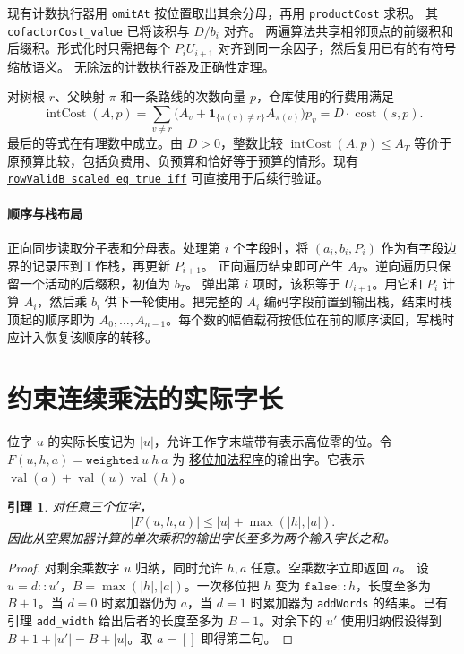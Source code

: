 \documentclass[UTF8,fontset=fandol,11pt,a4paper]{ctexart}
\newtheorem{lemma}{引理}
\newcommand{\len}[1]{\lvert #1\rvert}
\newcommand{\src}[2]{\href{https://github.com/huam54925-cpu/uav-routing-certification/blob/b083efc56ecf5b4f96f2e5b06134d1ed05806351/LeanCompletion/UAV/#1.lean}{#2}}
\begin{document}
现有计数执行器用 \texttt{omitAt} 按位置取出其余分母，再用 \texttt{productCost} 求积。
其 \texttt{cofactorCost\_value} 已将该积与 \(D/b_i\) 对齐。
两遍算法共享相邻顶点的前缀积和后缀积。形式化时只需把每个 \(P_iU_{i+1}\) 对齐到同一余因子，然后复用已有的有符号缩放语义。
\src{TreeBudgetBinaryPreprocessing}{无除法的计数执行器及正确性定理}。

对树根 \(r\)、父映射 \(\pi\) 和一条路线的次数向量 \(p\)，仓库使用的行费用满足
\[
 \operatorname{intCost}(A,p)
 =\sum_{v\ne r}
    \bigl(A_v+\mathbf{1}_{\{\pi(v)\ne r\}} A_{\pi(v)}\bigr)p_v
 = D\cdot\operatorname{cost}(s,p).
\]
最后的等式在有理数中成立。由 \(D>0\)，整数比较
\(\operatorname{intCost}(A,p)\le A_T\) 等价于原预算比较，包括负费用、负预算和恰好等于预算的情形。现有
\src{TreeBudgetVectorChecker}{\texttt{rowValidB\_scaled\_eq\_true\_iff}}
可直接用于后续行验证。

\paragraph{顺序与栈布局}
正向同步读取分子表和分母表。处理第 \(i\) 个字段时，将
\((a_i,b_i,P_i)\) 作为有字段边界的记录压到工作栈，再更新 \(P_{i+1}\)。
正向遍历结束即可产生 \(A_T\)。逆向遍历只保留一个活动的后缀积，初值为 \(b_T\)。
弹出第 \(i\) 项时，该积等于 \(U_{i+1}\)。用它和 \(P_i\) 计算 \(A_i\)，然后乘 \(b_i\) 供下一轮使用。把完整的 \(A_i\) 编码字段前置到输出栈，结束时栈顶起的顺序即为 \(A_0,\ldots,A_{n-1}\)。每个数的幅值载荷按低位在前的顺序读回，写栈时应计入恢复该顺序的转移。

\section{约束连续乘法的实际字长}

位字 \(u\) 的实际长度记为 \(\len{u}\)，允许工作字末端带有表示高位零的位。令
\(F(u,h,a)=\texttt{weighted}\ u\ h\ a\) 为
\src{TreeBudgetWeightedRuns}{移位加法程序}的输出字。它表示
\(\operatorname{val}(a)+\operatorname{val}(u)\operatorname{val}(h)\)。

\begin{lemma}
对任意三个位字，
\[
  \len{F(u,h,a)}\le \len{u}+\max(\len{h},\len{a}).
\]
因此从空累加器计算的单次乘积的输出字长至多为两个输入字长之和。
\end{lemma}
\begin{proof}
对剩余乘数字 \(u\) 归纳，同时允许 \(h,a\) 任意。空乘数字立即返回 \(a\)。
设 \(u=d::u'\)，\(B=\max(\len{h},\len{a})\)。一次移位把 \(h\) 变为
\(\texttt{false}::h\)，长度至多为 \(B+1\)。当 \(d=0\) 时累加器仍为 \(a\)，当 \(d=1\) 时累加器为 \texttt{addWords} 的结果。已有引理
\texttt{add\_width} 给出后者的长度至多为 \(B+1\)。对余下的 \(u'\) 使用归纳假设得到
\(B+1+\len{u'}=B+\len{u}\)。取 \(a=[]\) 即得第二句。
\end{proof}
\end{document}
